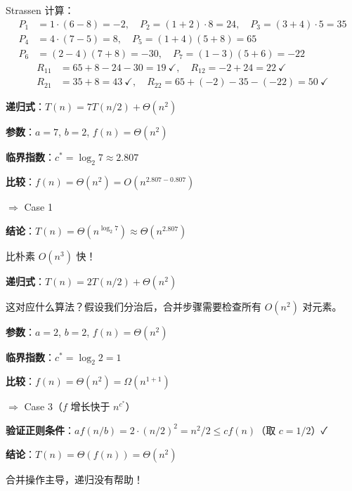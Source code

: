 \documentclass[12pt, a4paper]{ctexart}
\begin{document}
\begin{blackboard}
Strassen 计算：
\begin{align*}
P_1 &= 1\cdot(6-8) = -2, \quad P_2 = (1+2)\cdot8 = 24, \quad P_3 = (3+4)\cdot5 = 35 \\
P_4 &= 4\cdot(7-5) = 8, \quad P_5 = (1+4)(5+8) = 65 \\
P_6 &= (2-4)(7+8) = -30, \quad P_7 = (1-3)(5+6) = -22
\end{align*}
\begin{align*}
R_{11} &= 65+8-24-30 = 19\ \checkmark,\quad R_{12} = -2+24 = 22\ \checkmark \\
R_{21} &= 35+8 = 43\ \checkmark,\quad R_{22} = 65+(-2)-35-(-22) = 50\ \checkmark
\end{align*}

\textbf{递归式}：$T(n) = 7T(n/2) + \Theta(n^2)$

\textbf{参数}：$a = 7$, $b = 2$, $f(n) = \Theta(n^2)$

\textbf{临界指数}：$c^* = \log_2 7 \approx 2.807$

\textbf{比较}：$f(n) = \Theta(n^2) = O(n^{2.807 - 0.807})$

$\Rightarrow$ Case 1

\textbf{结论}：$T(n) = \Theta(n^{\log_2 7}) \approx \Theta(n^{2.807})$

比朴素 $O(n^3)$ 快！

\end{blackboard}

\begin{blackboard}

\textbf{递归式}：$T(n) = 2T(n/2) + \Theta(n^2)$

这对应什么算法？假设我们分治后，合并步骤需要检查所有 $O(n^2)$ 对元素。

\textbf{参数}：$a = 2$, $b = 2$, $f(n) = \Theta(n^2)$

\textbf{临界指数}：$c^* = \log_2 2 = 1$

\textbf{比较}：$f(n) = \Theta(n^2) = \Omega(n^{1 + 1})$

$\Rightarrow$ Case 3（$f$ 增长快于 $n^{c^*}$）

\textbf{验证正则条件}：$af(n/b) = 2 \cdot (n/2)^2 = n^2/2 \leq cf(n)$（取 $c = 1/2$）✓

\textbf{结论}：$T(n) = \Theta(f(n)) = \Theta(n^2)$

合并操作主导，递归没有帮助！

\end{blackboard}
\end{document}
